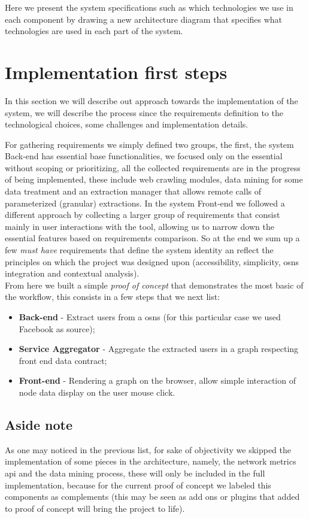 Here we present the system specifications such as which technologies we use in each component by drawing a new architecture diagram that specifies what technologies are used in each part of the system.

\section{Implementation first steps}
In this section we will describe out approach towards the implementation of the system, we will describe the process since the requirements
definition to the technological choices, some challenges and implementation details.

For gathering requirements we simply defined two groups, the first, the system Back-end has essential base functionalities, we focused only
on the essential without scoping or prioritizing, all the collected requirements are in the progress of being implemented, these include
web crawling modules, data mining for some data treatment and an extraction manager that allows remote calls of parameterized (granular) extractions.
In the system Front-end we followed a different approach by collecting a larger group of requirements that consist mainly in user interactions with the tool,
allowing us to narrow down the essential features based on requirements comparison. So at the end we sum up a few \textit{must have} requirements that
define the system identity an reflect the principles on which the project was designed upon (accessibility, simplicity, \glspl{osn} integration and contextual analysis).\\

\indent From here we built a simple \textit{proof of concept} that demonstrates the most basic of the workflow, this consists in a few steps that we next list:
\begin{itemize}
    \item \textbf{Back-end} - Extract users from a \glspl{osn} (for this particular case we used Facebook as source);
    \item \textbf{Service Aggregator} - Aggregate the extracted users in a graph respecting front end data contract;
    \item \textbf{Front-end} - Rendering a graph on the browser, allow simple interaction of node data display on the user mouse click.
\end{itemize}

\subsection*{Aside note}
As one may noticed in the previous list, for sake of objectivity we skipped the implementation of some pieces in the architecture,
namely, the network metrics api and the data mining process, these will only be included in the full implementation, because for the current proof
of concept we labeled this components as complements (this may be seen as add ons or plugins that added to proof of concept will bring the
project to life).\\

